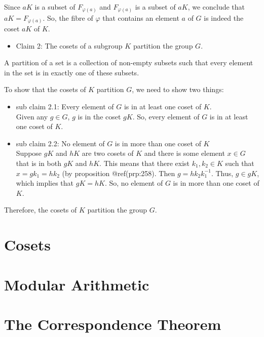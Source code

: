 \documentclass[
]{book}
\providecommand{\tightlist}{%
  \setlength{\itemsep}{0pt}\setlength{\parskip}{0pt}}
\begin{document}
Since \(aK\) is a subset of \(F_{\varphi(a)}\) and \(F_{\varphi(a)}\) is
a subset of \(aK\), we conclude that \(aK = F_{\varphi(a)}\). So, the
fibre of \(\varphi\) that contains an element \(a\) of \(G\) is indeed
the coset \(aK\) of \(K\).

\begin{itemize}
\tightlist
\item
  Claim 2: The cosets of a subgroup \(K\) partition the group \(G\).
\end{itemize}

A partition of a set is a collection of non-empty subsets such that
every element in the set is in exactly one of these subsets.

To show that the cosets of \(K\) partition \(G\), we need to show two
things:

\begin{itemize}
\item
  sub claim 2.1: Every element of \(G\) is in at least one coset of
  \(K\).\\
  Given any \(g \in G\), \(g\) is in the coset \(gK\). So, every element
  of \(G\) is in at least one coset of \(K\).
\item
  sub claim 2.2: No element of \(G\) is in more than one coset of
  \(K\)\\
  Suppose \(gK\) and \(hK\) are two cosets of \(K\) and there is some
  element \(x \in G\) that is in both \(gK\) and \(hK\). This means that
  there exist \(k_1, k_2 \in K\) such that \(x = gk_1 = hk_2\) (by
  proposition @ref(prp:258). Then \(g = hk_2k_1^{-1}\). Thus,
  \(g\in gK\), which implies that \(gK = hK\). So, no element of \(G\)
  is in more than one coset of \(K\).
\end{itemize}

Therefore, the cosets of \(K\) partition the group \(G\).

\hypertarget{cosets}{%
\section{Cosets}\label{cosets}}

\hypertarget{modular-arithmetic}{%
\section{Modular Arithmetic}\label{modular-arithmetic}}

\hypertarget{the-correspondence-theorem}{%
\section{The Correspondence Theorem}\label{the-correspondence-theorem}}
\end{document}
